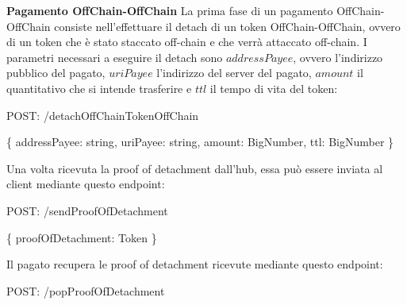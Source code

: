 \documentclass[12pt,italian,]{book}
\newenvironment{Shaded}{}{}
\newcommand{\DataTypeTok}[1]{\textcolor[rgb]{0.56,0.13,0.00}{#1}}
\newcommand{\NormalTok}[1]{#1}
\newcommand{\OperatorTok}[1]{\textcolor[rgb]{0.40,0.40,0.40}{#1}}
\newcommand{\SpecialStringTok}[1]{\textcolor[rgb]{0.73,0.40,0.53}{#1}}
\begin{document}
\textbf{\textbf{Pagamento OffChain-OffChain}} La prima fase di un pagamento OffChain-OffChain consiste nell'effettuare il detach di un token OffChain-OffChain, ovvero di un token che è stato staccato off-chain e che verrà attaccato off-chain. I parametri necessari a eseguire il detach sono \(addressPayee\), ovvero l'indirizzo pubblico del pagato, \(uriPayee\) l'indirizzo del server del pagato, \(amount\) il quantitativo che si intende trasferire e \(ttl\) il tempo di vita del token:

\begin{Shaded}
\begin{Highlighting}[]
\NormalTok{POST}\OperatorTok{:} \SpecialStringTok{/detachOffChainTokenOffChain}
\end{Highlighting}
\end{Shaded}

\begin{Shaded}
\begin{Highlighting}[]
\OperatorTok{\{}
    \DataTypeTok{addressPayee}\OperatorTok{:}\NormalTok{ string}\OperatorTok{,}
    \DataTypeTok{uriPayee}\OperatorTok{:}\NormalTok{ string}\OperatorTok{,}
    \DataTypeTok{amount}\OperatorTok{:}\NormalTok{ BigNumber}\OperatorTok{,}
    \DataTypeTok{ttl}\OperatorTok{:}\NormalTok{ BigNumber}
\OperatorTok{\}}
\end{Highlighting}
\end{Shaded}

Una volta ricevuta la proof of detachment dall'hub, essa può essere inviata al client mediante questo endpoint:

\begin{Shaded}
\begin{Highlighting}[]
\NormalTok{POST}\OperatorTok{:} \SpecialStringTok{/sendProofOfDetachment}
\end{Highlighting}
\end{Shaded}

\begin{Shaded}
\begin{Highlighting}[]
\OperatorTok{\{}
    \DataTypeTok{proofOfDetachment}\OperatorTok{:}\NormalTok{ Token}
\OperatorTok{\}}
\end{Highlighting}
\end{Shaded}

Il pagato recupera le proof of detachment ricevute mediante questo endpoint:

\begin{Shaded}
\begin{Highlighting}[]
\NormalTok{POST}\OperatorTok{:} \SpecialStringTok{/popProofOfDetachment}
\end{Highlighting}
\end{Shaded}
\end{document}
